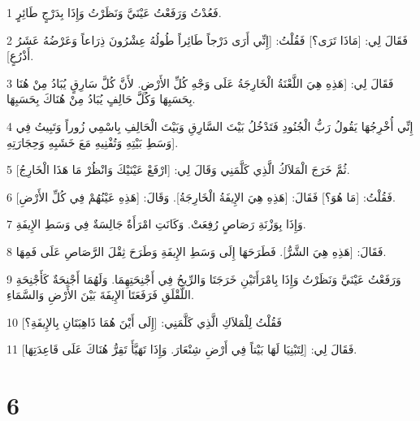 \par 1 فَعُدْتُ وَرَفَعْتُ عَيْنَيَّ وَنَظَرْتُ وَإِذَا بِدَرْجٍ طَائِرٍ.
\par 2 فَقَالَ لِي: [مَاذَا تَرَى؟] فَقُلْتُ: [إِنِّي أَرَى دَرْجاً طَائِراً طُولُهُ عِشْرُونَ ذِرَاعاً وَعَرْضُهُ عَشَرُ أَذْرُعٍ].
\par 3 فَقَالَ لِي: [هَذِهِ هِيَ اللَّعْنَةُ الْخَارِجَةُ عَلَى وَجْهِ كُلِّ الأَرْضِ. لأَنَّ كُلَّ سَارِقٍ يُبَادُ مِنْ هُنَا بِحَسَبِهَا وَكُلَّ حَالِفٍ يُبَادُ مِنْ هُنَاكَ بِحَسَبِهَا.
\par 4 إِنِّي أُخْرِجُهَا يَقُولُ رَبُّ الْجُنُودِ فَتَدْخُلُ بَيْتَ السَّارِقِ وَبَيْتَ الْحَالِفِ بِاسْمِي زُوراً وَتَبِيتُ فِي وَسَطِ بَيْتِهِ وَتُفْنِيهِ مَعَ خَشَبِهِ وَحِجَارَتِهِ].
\par 5 ثُمَّ خَرَجَ الْمَلاَكُ الَّذِي كَلَّمَنِي وَقَالَ لِي: [ارْفَعْ عَيْنَيْكَ وَانْظُرْ مَا هَذَا الْخَارِجُ].
\par 6 فَقُلْتُ: [مَا هُوَ؟] فَقَالَ: [هَذِهِ هِيَ الإِيفَةُ الْخَارِجَةُ]. وَقَالَ: [هَذِهِ عَيْنُهُمْ فِي كُلِّ الأَرْضِ].
\par 7 وَإِذَا بِوَزْنَةِ رَصَاصٍ رُفِعَتْ. وَكَانَتِ امْرَأَةٌ جَالِسَةٌ فِي وَسَطِ الإِيفَةِ.
\par 8 فَقَالَ: [هَذِهِ هِيَ الشَّرُّ]. فَطَرَحَهَا إِلَى وَسَطِ الإِيفَةِ وَطَرَحَ ثِقْلَ الرَّصَاصِ عَلَى فَمِهَا.
\par 9 وَرَفَعْتُ عَيْنَيَّ وَنَظَرْتُ وَإِذَا بِامْرَأَتَيْنِ خَرَجَتَا وَالرِّيحُ فِي أَجْنِحَتِهِمَا. وَلَهُمَا أَجْنِحَةٌ كَأَجْنِحَةِ اللَّقْلَقِ فَرَفَعَتَا الإِيفَةَ بَيْنَ الأَرْضِ وَالسَّمَاءِ.
\par 10 فَقُلْتُ لِلْمَلاَكِ الَّذِي كَلَّمَنِي: [إِلَى أَيْنَ هُمَا ذَاهِبَتَانِ بِالإِيفَةِ؟]
\par 11 فَقَالَ لِي: [لِتَبْنِيَا لَهَا بَيْتاً فِي أَرْضِ شِنْعَارَ. وَإِذَا تَهَيَّأَ تَقِرُّ هُنَاكَ عَلَى قَاعِدَتِهَا].

\chapter{6}

